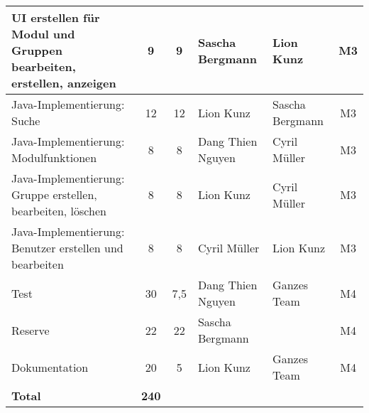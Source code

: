 \begin{landscape}
\begin{tabularx}{\linewidth}{|X|c|c|l|l|c|}
UI erstellen für Modul und Gruppen bearbeiten, erstellen, anzeigen		&	9	&	9	&	Sascha Bergmann	&	Lion Kunz&	M3\\ \hline
Java-Implementierung: Suche 											&	12	&	12	&	Lion Kunz		&	Sascha Bergmann&	M3\\ \hline
Java-Implementierung: Modulfunktionen 									&	8	&	8	&	Dang Thien Nguyen&	Cyril Müller&	M3\\ \hline
Java-Implementierung: Gruppe erstellen, bearbeiten, löschen 			&	8	&	8	&	Lion Kunz		&	Cyril Müller&	M3\\ \hline
Java-Implementierung: Benutzer erstellen und bearbeiten 				&	8	&	8	&	Cyril Müller	&	Lion Kunz&	M3\\ \hline
Test 																	&	30	&	7,5	&	Dang Thien Nguyen&	Ganzes Team&	M4\\ \hline
Reserve 																&	22	&	22	&	Sascha Bergmann	&	&	M4\\ \hline
Dokumentation 															&	20	&	5	&	Lion Kunz		&	Ganzes Team&	M4\\ \hline
\textbf{Total}																	&	\textbf{240}	&		&	&	&	\\ \hline
\end{tabularx}
\end{landscape}
